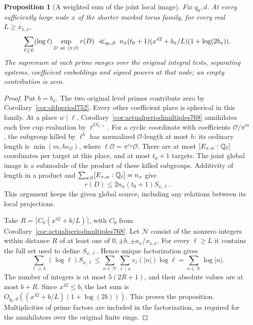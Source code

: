 \documentclass[a4paper,11pt]{article}
\newtheorem{proposition}{Proposition}[section]
\theoremstyle{definition}
\theoremstyle{remark}
\numberwithin{equation}{section}
\begin{document}
\begin{proposition}[A weighted sum of the joint local image]
\leavevmode\label{prop:weightedlocaltail769}
Fix \(q_0,d\). At every sufficiently large node \(x\) of the
shorter marked torus family, for every real \(L\ge x_{1,x}\),
\[
 \sum_{\ell\ge L}(\log\ell)
           \sup_{D\ {\rm at}\ (x,\ell)}r(D)
 \ \ll_{q_0,d}\
 n_x(t_0+1)(x^{42}+b_x/L)(1+\log(2b_x)).
\]
The supremum at each prime ranges over the original integral
tests, separating systems, coefficient embeddings and signed
powers at that node; an empty contribution is zero.
\end{proposition}
\begin{proof}
Put \(b=b_x\). The two original level primes contribute
zero by Corollary~\ref{cor:oldperiod752}. Every other
coefficient place is spherical in this family. At a place
\(w\mid\ell\), Corollary~\ref{cor:actualperiodmultiples768}
annihilates each free cup evaluation by \(\ell^{2S_{x,\ell}}\).
For a cyclic coordinate with coefficients \(\mathcal O/\pi^m\),
the subgroup killed by \(\ell^h\) has normalized
\(\mathcal O\)-length at most \(h\): its ordinary length is
\(\min(m,h e_{\mathcal O})\), where
\(\ell\mathcal O=\pi^{e_{\mathcal O}}\mathcal O\).
There are at most \([E_{x,w}:\mathbb Q_\ell]\) coordinates per
target at this place, and at most \(t_0+1\) targets.
The joint global image is a submodule of the product of
these killed subgroups. Additivity of length in a product
and \(\sum_{w\mid\ell}[E_{x,w}:\mathbb Q_\ell]=n_x\) give
\[
        r(D)\le 2n_x(t_0+1) S_{x,\ell}.
\]
This argument keeps the given global source, including any
relations between its local projections.

Take \(R=\lceil C_0(x^{42}+b/L)\rceil\), with \(C_0\) from
Corollary~\ref{cor:actualperiodmultiples768}. Let \(\mathcal N\)
consist of the nonzero integers within distance \(R\) of
at least one of \(0,\pm b,\pm a_x/x_{1,x}\). For every
\(\ell\ge L\) it contains the full set used to define
\(S_{x,\ell}\). Hence unique factorization gives
\[
 \sum_{\ell\ge L}(\log\ell) S_{x,\ell}
  \le \sum_{n\in\mathcal N}\sum_{\ell\mid n}
           v_\ell(|n|)\log\ell
   =\sum_{n\in\mathcal N}\log|n|.
\]
The number of integers is at most \(5(2R+1)\), and their
absolute values are at most \(b+R\). Since \(x^{42}\le b\),
the last sum is \(O_{q_0,d}((x^{42}+b/L)(1+\log(2b)))\).
This proves the proposition. Multiplicities of prime factors
are included in the factorization, as required for the
annihilators over the original finite rings.
\end{proof}
\end{document}
